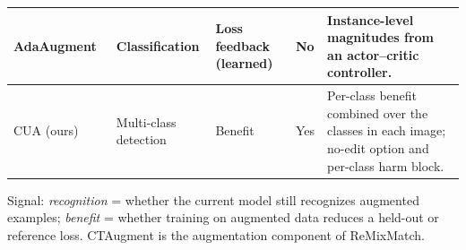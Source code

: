 \begin{table}[t]
\begin{tabularx}{\textwidth}{@{}p{}p{}p{}p{}Y@{}}
AdaAugment~\cite{yang2025adaaugment} & Classification & Loss feedback (learned) & No & Instance-level magnitudes from an actor--critic controller. \\
\midrule
CUA (ours) & Multi-class detection & Benefit & Yes & Per-class benefit combined over the classes in each image; no-edit option and per-class harm block. \\
\bottomrule
\end{tabularx}
\vspace{3pt}
\begin{minipage}{\textwidth}
\footnotesize
Signal: \emph{recognition} = whether the current model still recognizes augmented examples; \emph{benefit} = whether training on augmented data reduces a held-out or reference loss. CTAugment is the augmentation component of ReMixMatch.
\end{minipage}
\end{table}


